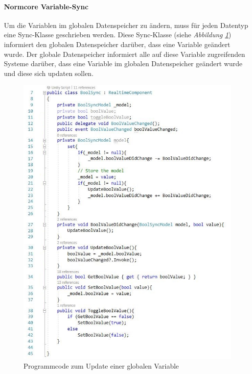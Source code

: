\documentclass[a4paper,11pt]{article}%
\renewcommand{\\}{\vspace*{0.5\baselineskip} \newline}
\begin{document}
\paragraph{Normcore Variable-Sync}
Um die Variablen im globalen Datenspeicher zu ändern, muss für jeden Datentyp eine Sync-Klasse geschrieben werden. Diese Sync-Klasse (siehe \textit{Abbildung \ref{boolSync}}) informiert den globalen Datenspeicher darüber, dass eine Variable geändert wurde. Der globale Datenspeicher informiert alle auf diese Variable zugreifenden Systeme darüber, dass eine Variable im globalen Datenspeicher geändert wurde und diese sich updaten sollen.

\begin{figure}[H]
		\begin{footnotesize}
			\includegraphics[scale=.75]{Abbildungen/boolValueChanged.jpg}
			\caption[Update von globalen Variablen]{Programmcode zum Update einer globalen Variable}
			\label{boolSync}
		\end{footnotesize}
	\end{figure}
\end{document}
